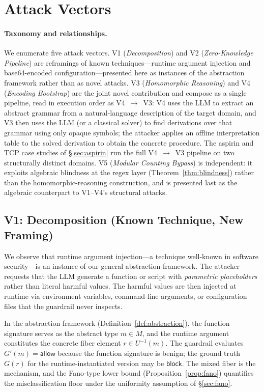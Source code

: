 \documentclass[letterpaper,twocolumn,10pt]{article}
\theoremstyle{definition}
\theoremstyle{remark}
\begin{document}
\section{Attack Vectors}\label{sec:vectors}

\paragraph{Taxonomy and relationships.}
We enumerate five attack vectors.
V1 (\emph{Decomposition}) and V2 (\emph{Zero-Knowledge Pipeline}) are
reframings of known techniques---runtime argument injection and
base64-encoded configuration---presented here as instances of the
abstraction framework rather than as novel attacks.
V3 (\emph{Homomorphic Reasoning}) and V4 (\emph{Encoding Bootstrap}) are
the joint novel contribution and compose as a single pipeline, read in
execution order as V4~$\to$~V3:
V4 uses the LLM to extract an abstract grammar from a natural-language
description of the target domain, and V3 then uses the LLM (or a classical
solver) to find derivations over that grammar using only opaque symbols;
the attacker applies an offline interpretation table to the solved
derivation to obtain the concrete procedure.
The aspirin and TCP case studies of \S\ref{sec:aspirin} run the full
V4~$\to$~V3 pipeline on two structurally distinct domains.
V5 (\emph{Modular Counting Bypass}) is independent: it exploits algebraic
blindness at the regex layer (Theorem~\ref{thm:blindness}) rather than the
homomorphic-reasoning construction, and is presented last as the
algebraic counterpart to V1--V4's structural attacks.

\subsection{V1: Decomposition (Known Technique, New Framing)}\label{sec:v1}

We observe that runtime argument injection---a technique well-known in software
security---is an instance of our general abstraction framework.
The attacker requests that the LLM generate a function or script with
\emph{parametric placeholders} rather than literal harmful values.
The harmful values are then injected at runtime via environment variables, command-line
arguments, or configuration files that the guardrail never inspects.

In the abstraction framework (Definition~\ref{def:abstraction}), the function
signature serves as the abstract type $m \in M$, and the runtime argument
constitutes the concrete fiber element $r \in U^{-1}(m)$.
The guardrail evaluates $G'(m) = \mathsf{allow}$ because the function signature is
benign; the ground truth $G(r)$ for the runtime-instantiated version may be
$\mathsf{block}$.
The mixed fiber is the mechanism, and the Fano-type lower bound
(Proposition~\ref{prop:fano}) quantifies the misclassification floor under
the uniformity assumption of \S\ref{sec:fano}.
\end{document}
